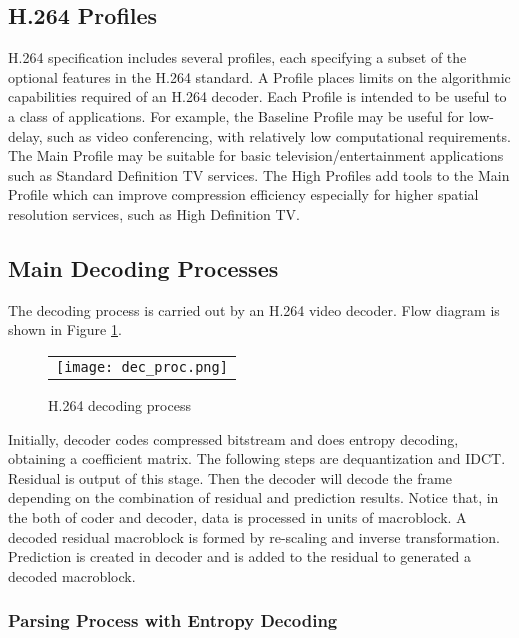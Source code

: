 \documentclass[../main.tex]{subfiles}
\begin{document}
\subsection{ H.264 Profiles}

H.264 specification includes several profiles, each specifying a subset of the optional features in the H.264 standard. A Profile places limits on the algorithmic capabilities
required of an H.264 decoder. Each Profile is intended to be useful to a class of
applications. For example, the Baseline Profile may be useful for low-delay, such as video conferencing, with relatively low computational requirements. The
Main Profile may be suitable for basic television/entertainment applications such as Standard
Definition TV services. The High Profiles add tools to the Main Profile which can improve compression efficiency especially for higher spatial resolution services, such as High Definition TV.



\subsection{ Main Decoding Processes }

The decoding process is carried out by an H.264 video decoder. Flow diagram is shown in Figure \ref{fig:decproc}.

\begin{figure} [ht]
\begin{center}
\begin{tabular}{c} %
\texttt{[image: dec\_proc.png]}
\end{tabular}
\end{center}
\caption[decproc] 
{ \label{fig:decproc} H.264 decoding process}
\end{figure} 

Initially, decoder codes compressed bitstream and does entropy decoding, obtaining a coefficient matrix. The following steps are dequantization and IDCT. Residual is output of this stage. Then the decoder will decode the frame depending on the combination of residual and prediction results. Notice that, in the both of coder and decoder, data is processed in units of macroblock. A decoded residual macroblock is formed by re-scaling and inverse transformation. Prediction is created in decoder and is added to the residual to generated a decoded macroblock. 

\subsubsection{ Parsing Process with Entropy Decoding }
\end{document}
